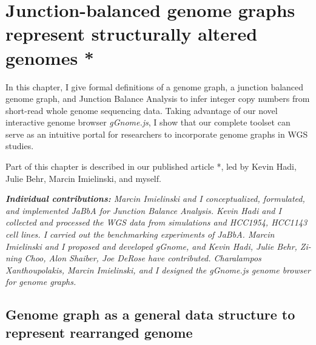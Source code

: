 \documentclass[phd,tocprelim]{cornell}
\begin{document}
\chapter{Junction-balanced genome graphs represent structurally altered genomes *} \label{chap:gg}
In this chapter, I give formal definitions of a genome graph, a junction balanced genome graph, and Junction Balance Analysis to infer integer copy numbers from short-read whole genome sequencing data. Taking advantage of our novel interactive genome browser \textit{gGnome.js}, I show that our complete toolset can serve as an intuitive portal for researchers to incorporate genome graphs in WGS studies. 

Part of this chapter is described in our published article \cite{Hadi2020-um}*, led by Kevin Hadi, Julie Behr, Marcin Imielinski, and myself.

\textit{
    \textbf{Individual contributions:} Marcin Imielinski and I conceptualized, formulated, and implemented JaBbA for Junction Balance Analysis. Kevin Hadi and I collected and processed the WGS data from simulations and HCC1954, HCC1143 cell lines. I carried out the benchmarking experiments of JaBbA. Marcin Imielinski and I proposed and developed gGnome, and Kevin Hadi, Julie Behr, Zi-ning Choo, Alon Shaiber, Joe DeRose have contributed. Charalampos Xanthoupolakis, Marcin Imielinski, and I designed the gGnome.js genome browser for genome graphs.    
}


\newpage

\section{Genome graph as a general data structure to represent rearranged genome}
\end{document}

